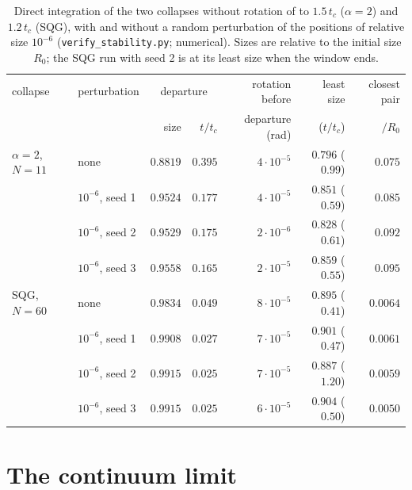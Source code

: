 \documentclass[11pt]{article}
\theoremstyle{definition}
\begin{document}
\begin{table}[t]
\centering
\small
\renewcommand{\arraystretch}{1.12}
\begin{tabular}{@{}llrrrrr@{}}
\toprule
collapse & perturbation & \multicolumn{2}{c}{departure} & rotation before & least size & closest pair \\
 & & size & $t/t_c$ & departure (rad) & ($t/t_c$) & $/R_0$ \\
\midrule
$\alpha = 2$, $N = 11$ & none & $0.8819$ & $0.395$ & $4 \cdot 10^{-5}$ & $0.796$ ($0.99$) & $0.075$ \\
 & $10^{-6}$, seed 1 & $0.9524$ & $0.177$ & $4 \cdot 10^{-5}$ & $0.851$ ($0.59$) & $0.085$ \\
 & $10^{-6}$, seed 2 & $0.9529$ & $0.175$ & $2 \cdot 10^{-6}$ & $0.828$ ($0.61$) & $0.092$ \\
 & $10^{-6}$, seed 3 & $0.9558$ & $0.165$ & $2 \cdot 10^{-5}$ & $0.859$ ($0.55$) & $0.095$ \\
SQG, $N = 60$ & none & $0.9834$ & $0.049$ & $8 \cdot 10^{-5}$ & $0.895$ ($0.41$) & $0.0064$ \\
 & $10^{-6}$, seed 1 & $0.9908$ & $0.027$ & $7 \cdot 10^{-5}$ & $0.901$ ($0.47$) & $0.0061$ \\
 & $10^{-6}$, seed 2 & $0.9915$ & $0.025$ & $7 \cdot 10^{-5}$ & $0.887$ ($1.20$) & $0.0059$ \\
 & $10^{-6}$, seed 3 & $0.9915$ & $0.025$ & $6 \cdot 10^{-5}$ & $0.904$ ($0.50$) & $0.0050$ \\
\bottomrule
\end{tabular}
\caption{Direct integration of the two collapses without rotation of \cite[Theorem~5]{mw2026} to $1.5\,t_c$ ($\alpha = 2$) and $1.2\,t_c$ (SQG), with and without a random perturbation of the positions of relative size $10^{-6}$ (\texttt{verify\_\allowbreak stability.py}; numerical). Sizes are relative to the initial size $R_0$; the SQG run with seed 2 is at its least size when the window ends.}\label{tab:stability}
\end{table}

\section{The continuum limit}\label{sec:continuum}
\end{document}
